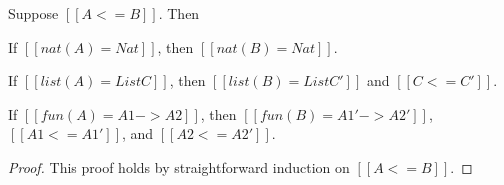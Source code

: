 

\begin{lemma}
  \label{lemma:fun_type_pre}
  Suppose $[[A <= B]]$.  Then
  \begin{enumR}
  \item If $[[nat(A) = Nat]]$, then $[[nat(B) = Nat]]$.    
  \item If $[[list(A) = List C]]$, then $[[list(B) = List C']]$ and $[[C <= C']]$.
  \item If $[[fun(A) = A1 -> A2]]$, then $[[fun(B) = A1' -> A2']]$, $[[A1 <= A1']]$, and $[[A2 <= A2']]$.
  \end{enumR}
\end{lemma}
\begin{proof}
  This proof holds by straightforward induction on $[[A <= B]]$.
\end{proof}


